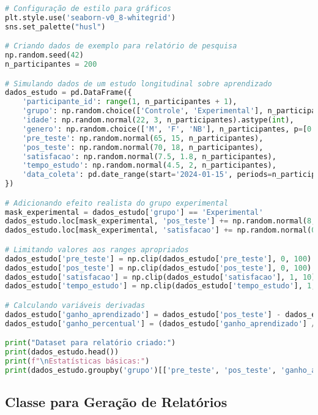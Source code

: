 \begin{pythonbox}
\begin{lstlisting}[language=Python]
# Configuração de estilo para gráficos
plt.style.use('seaborn-v0_8-whitegrid')
sns.set_palette("husl")

# Criando dados de exemplo para relatório de pesquisa
np.random.seed(42)
n_participantes = 200

# Simulando dados de um estudo longitudinal sobre aprendizado
dados_estudo = pd.DataFrame({
    'participante_id': range(1, n_participantes + 1),
    'grupo': np.random.choice(['Controle', 'Experimental'], n_participantes),
    'idade': np.random.normal(22, 3, n_participantes).astype(int),
    'genero': np.random.choice(['M', 'F', 'NB'], n_participantes, p=[0.45, 0.45, 0.1]),
    'pre_teste': np.random.normal(65, 15, n_participantes),
    'pos_teste': np.random.normal(70, 18, n_participantes),
    'satisfacao': np.random.normal(7.5, 1.8, n_participantes),
    'tempo_estudo': np.random.normal(4.5, 2, n_participantes),
    'data_coleta': pd.date_range(start='2024-01-15', periods=n_participantes, freq='D')
})

# Adicionando efeito realista do grupo experimental
mask_experimental = dados_estudo['grupo'] == 'Experimental'
dados_estudo.loc[mask_experimental, 'pos_teste'] += np.random.normal(8, 3, mask_experimental.sum())
dados_estudo.loc[mask_experimental, 'satisfacao'] += np.random.normal(0.8, 0.4, mask_experimental.sum())

# Limitando valores aos ranges apropriados
dados_estudo['pre_teste'] = np.clip(dados_estudo['pre_teste'], 0, 100)
dados_estudo['pos_teste'] = np.clip(dados_estudo['pos_teste'], 0, 100)
dados_estudo['satisfacao'] = np.clip(dados_estudo['satisfacao'], 1, 10)
dados_estudo['tempo_estudo'] = np.clip(dados_estudo['tempo_estudo'], 1, 10)

# Calculando variáveis derivadas
dados_estudo['ganho_aprendizado'] = dados_estudo['pos_teste'] - dados_estudo['pre_teste']
dados_estudo['ganho_percentual'] = (dados_estudo['ganho_aprendizado'] / dados_estudo['pre_teste']) * 100

print("Dataset para relatório criado:")
print(dados_estudo.head())
print(f"\nEstatísticas básicas:")
print(dados_estudo.groupby('grupo')[['pre_teste', 'pos_teste', 'ganho_aprendizado']].mean())
\end{lstlisting}
\end{pythonbox}

\subsection{Classe para Geração de Relatórios}

